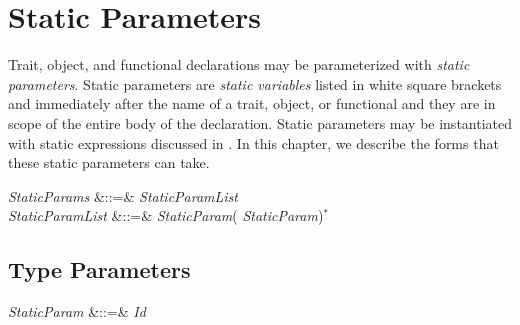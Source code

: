 %
%
%
%

\chapter{Static Parameters}


Trait, object, and functional declarations may be
parameterized with \emph{static parameters}.
Static parameters are \emph{static variables} listed in white
square brackets \EXP{\llbracket} and \EXP{\rrbracket}
immediately after the name of a trait, object, or functional and
they are in scope of the entire body of the declaration.
Static parameters may be instantiated with static expressions discussed in
.
In this chapter, we describe the forms that
these static parameters can take.

\begin{Grammar}
\emph{StaticParams} &::=&
\bTPl \emph{StaticParamList}\bTPr\\
\emph{StaticParamList} &::=& \emph{StaticParam}(\EXP{,} \emph{StaticParam})$^*$\\
\end{Grammar}

\section{Type Parameters}

\begin{Grammar}
\emph{StaticParam} &::=&
\emph{Id}   \\
\end{Grammar}

